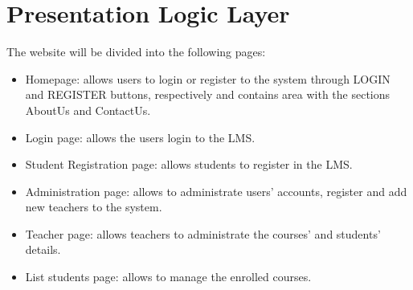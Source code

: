 \newpage
\section{Presentation Logic Layer}
\graphicspath{ {./HW_1/images/} }

The website will be divided into the following pages:
\begin{itemize}
    \item Homepage: allows users to login or register to the system through LOGIN and REGISTER buttons, respectively and contains area with the sections AboutUs and ContactUs.
    \item Login page: allows the users login to the LMS.
    \item Student Registration page: allows students to register in the LMS.
    \item Administration page: allows to administrate users’ accounts, register and add new teachers to the system. 
    \item Teacher page: allows teachers to administrate the courses' and students' details.
    \item List students page: allows to manage the enrolled courses.

\end{itemize}







